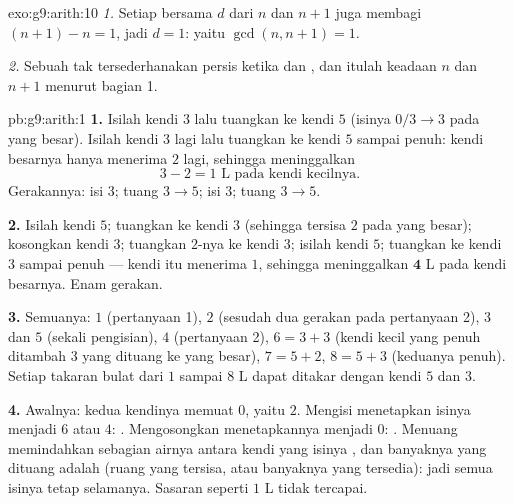 \begin{solution}{exo:g9:arith:10}
\emph{1.} Setiap  bersama $d$ dari $n$ dan $n+1$ juga membagi
 $(n+1) - n = 1$, jadi $d = 1$: yaitu $\gcd(n, n+1) = 1$.

\emph{2.} Sebuah  tak tersederhanakan persis ketika 
dan  , dan itulah keadaan $n$ dan $n + 1$
menurut bagian 1.
\end{solution}

\begin{solution}{pb:g9:arith:1}
\textbf{1.} Isilah kendi $3$ lalu tuangkan ke kendi $5$ (isinya
$0/3 \to 3$ pada yang besar). Isilah kendi $3$ lagi lalu tuangkan ke
kendi $5$ sampai penuh: kendi besarnya hanya menerima $2$ lagi,
sehingga meninggalkan
\[
3 - 2 = 1 \text{ L pada kendi kecilnya.}
\]
Gerakannya: isi $3$; tuang $3 \to 5$; isi $3$; tuang $3 \to 5$.

\textbf{2.} Isilah kendi $5$; tuangkan ke kendi $3$ (sehingga
tersisa $2$ pada yang besar); kosongkan kendi $3$; tuangkan $2$-nya
ke kendi $3$; isilah kendi $5$; tuangkan ke kendi $3$ sampai penuh
--- kendi itu menerima $1$, sehingga meninggalkan
$\mathbf{4}$ L pada kendi besarnya. Enam gerakan.

\textbf{3.} Semuanya: $1$ (pertanyaan 1), $2$ (sesudah dua gerakan
pada pertanyaan 2), $3$ dan $5$ (sekali pengisian), $4$ (pertanyaan
2), $6 = 3 + 3$ (kendi kecil yang penuh ditambah $3$ yang dituang ke
yang besar), $7 = 5 + 2$, $8 = 5 + 3$ (keduanya penuh). Setiap takaran
bulat dari $1$ sampai $8$ L dapat ditakar dengan kendi $5$ dan $3$.

\textbf{4.} Awalnya: kedua kendinya memuat $0$, yaitu  $2$.
Mengisi menetapkan isinya menjadi $6$ atau $4$: . Mengosongkan
menetapkannya menjadi $0$: . Menuang memindahkan sebagian airnya
antara kendi yang isinya , dan banyaknya yang dituang adalah
  (ruang yang tersisa, atau banyaknya yang
tersedia): jadi semua isinya tetap  selamanya. Sasaran 
seperti $1$ L tidak tercapai.


\end{solution}
